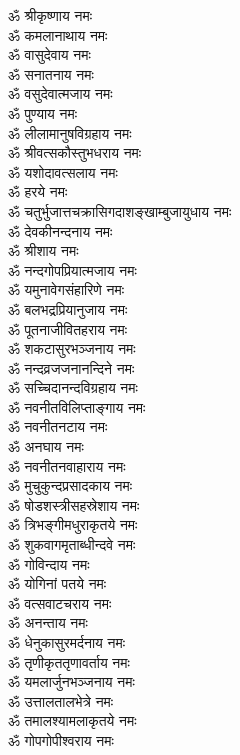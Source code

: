 \begin{multicols}{2}\setlength{\columnseprule}{1pt}
\begin{flushleft}
ॐ श्रीकृष्णाय नमः\\
ॐ कमलानाथाय नमः\\
ॐ वासुदेवाय नमः\\
ॐ सनातनाय नमः\\
ॐ वसुदेवात्मजाय नमः\\
ॐ पुण्याय नमः\\
ॐ लीलामानुषविग्रहाय नमः\\
ॐ श्रीवत्सकौस्तुभधराय नमः\\
ॐ यशोदावत्सलाय नमः\\
ॐ हरये नमः\hfill{}\\
ॐ चतुर्भुजात्तचक्रासि\-गदाशङ्खाम्बुजायुधाय नमः\\
ॐ देवकीनन्दनाय नमः\\
ॐ श्रीशाय नमः\\
ॐ नन्दगोपप्रियात्मजाय नमः\\
ॐ यमुनावेगसंहारिणे नमः\\
ॐ बलभद्रप्रियानुजाय नमः\\
ॐ पूतनाजीवितहराय नमः\\
ॐ शकटासुरभञ्जनाय नमः\\
ॐ नन्दव्रजजनानन्दिने नमः\\
ॐ सच्चिदानन्दविग्रहाय नमः\hfill{}\\
ॐ नवनीतविलिप्ताङ्गाय नमः\\
ॐ नवनीतनटाय नमः\\
ॐ अनघाय नमः\\
ॐ नवनीतनवाहाराय नमः\\
ॐ मुचुकुन्दप्रसादकाय नमः\\
ॐ षोडशस्त्रीसहस्रेशाय नमः\\
ॐ त्रिभङ्गीमधुराकृतये नमः\\
ॐ शुकवागमृताब्धीन्दवे नमः\\
ॐ गोविन्दाय नमः\\
ॐ योगिनां पतये नमः\hfill{}\\
ॐ वत्सवाटचराय नमः\\
ॐ अनन्ताय नमः\\
ॐ धेनुकासुरमर्दनाय नमः\\
ॐ तृणीकृततृणावर्ताय नमः\\
ॐ यमलार्जुनभञ्जनाय नमः\\
ॐ उत्तालतालभेत्रे नमः\\
ॐ तमालश्यामलाकृतये नमः\\
ॐ गोपगोपीश्वराय नमः\\

\end{flushleft}
\end{multicols}
